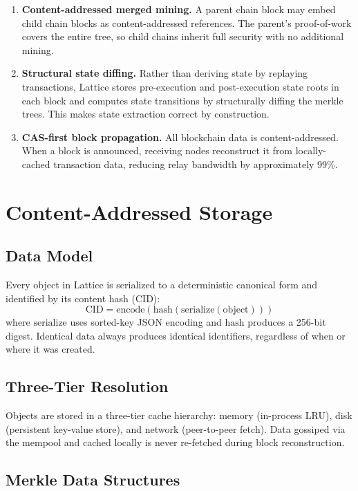 \documentclass[11pt,a4paper]{article}
\begin{document}
\begin{enumerate}[leftmargin=*]
\item \textbf{Content-addressed merged mining.} A parent chain block may embed child chain blocks as content-addressed references. The parent's proof-of-work covers the entire tree, so child chains inherit full security with no additional mining.

\item \textbf{Structural state diffing.} Rather than deriving state by replaying transactions, Lattice stores pre-execution and post-execution state roots in each block and computes state transitions by structurally diffing the merkle trees. This makes state extraction correct by construction.

\item \textbf{CAS-first block propagation.} All blockchain data is content-addressed. When a block is announced, receiving nodes reconstruct it from locally-cached transaction data, reducing relay bandwidth by approximately 99\%.
\end{enumerate}

\section{Content-Addressed Storage}

\subsection{Data Model}

Every object in Lattice is serialized to a deterministic canonical form and identified by its content hash (CID):
\[
\text{CID} = \text{encode}(\text{hash}(\text{serialize}(\text{object})))
\]
where $\text{serialize}$ uses sorted-key JSON encoding and $\text{hash}$ produces a 256-bit digest. Identical data always produces identical identifiers, regardless of when or where it was created.

\subsection{Three-Tier Resolution}

Objects are stored in a three-tier cache hierarchy: memory (in-process LRU), disk (persistent key-value store), and network (peer-to-peer fetch). Data gossiped via the mempool and cached locally is never re-fetched during block reconstruction.

\subsection{Merkle Data Structures}
\end{document}
